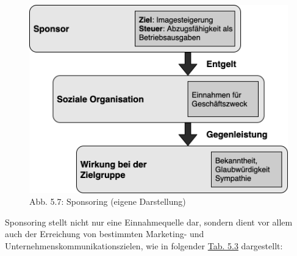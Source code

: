 \documentclass[
  letterpaper,
]{book}
\begin{document}
\begin{figure}

\includegraphics[width=0.6\linewidth,height=\textheight,keepaspectratio]{images/figure57.png} \hfill{}

\caption{Abb. 5.7: Sponsoring (eigene Darstellung)}

\end{figure}%

Sponsoring stellt nicht nur eine Einnahmequelle dar, sondern dient vor
allem auch der Erreichung von bestimmten Marketing- und
Unternehmenskommunikationszielen, wie in folgender
\hyperref[table53]{Tab. 5.3} dargestellt:
\end{document}
